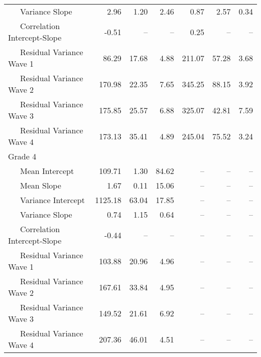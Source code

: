 \begin{appendix}
\begin{center}
\begin{ThreePartTable}
\begin{longtable}{lrrrrrr}
\ \ \ Variance Slope & 2.96 & 1.20 & 2.46 & 0.87 & 2.57 & 0.34\\
\ \ \ Correlation Intercept-Slope & -0.51 & -- & -- & 0.25 & -- & --\\
\ \ \ Residual Variance Wave 1 & 86.29 & 17.68 & 4.88 & 211.07 & 57.28 & 3.68\\
\ \ \ Residual Variance Wave 2 & 170.98 & 22.35 & 7.65 & 345.25 & 88.15 & 3.92\\
\ \ \ Residual Variance Wave 3 & 175.85 & 25.57 & 6.88 & 325.07 & 42.81 & 7.59\\
\ \ \ Residual Variance Wave 4 & 173.13 & 35.41 & 4.89 & 245.04 & 75.52 & 3.24\\
Grade 4 &  &  &  &  &  & \\
\ \ \ Mean Intercept & 109.71 & 1.30 & 84.62 & -- & -- & --\\
\ \ \ Mean Slope & 1.67 & 0.11 & 15.06 & -- & -- & --\\
\ \ \ Variance Intercept & 1125.18 & 63.04 & 17.85 & -- & -- & --\\
\ \ \ Variance Slope & 0.74 & 1.15 & 0.64 & -- & -- & --\\
\ \ \ Correlation Intercept-Slope & -0.44 & -- & -- & -- & -- & --\\
\ \ \ Residual Variance Wave 1 & 103.88 & 20.96 & 4.96 & -- & -- & --\\
\ \ \ Residual Variance Wave 2 & 167.61 & 33.84 & 4.95 & -- & -- & --\\
\ \ \ Residual Variance Wave 3 & 149.52 & 21.61 & 6.92 & -- & -- & --\\
\ \ \ Residual Variance Wave 4 & 207.36 & 46.01 & 4.51 & -- & -- & --\\
\bottomrule
\end{longtable}

\end{ThreePartTable}
\end{center}
\end{appendix}
